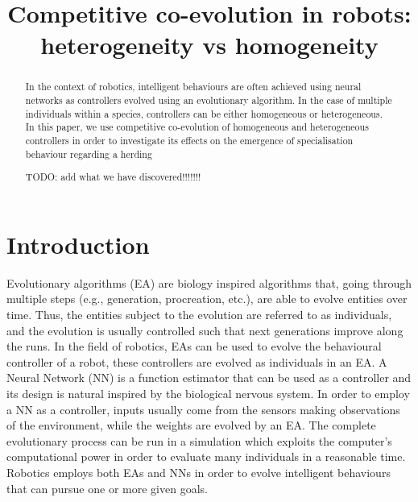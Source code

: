 \documentclass[conference]{IEEEtran}
\begin{document}
 
\title{Competitive co-evolution in robots: \\ heterogeneity vs homogeneity}



\author{
}



\maketitle


\begin{abstract}
In the context of robotics, intelligent behaviours are often achieved using neural networks as controllers evolved using  an evolutionary algorithm.
In the case of multiple individuals within a species, controllers can be either homogeneous or heterogeneous.
In this paper, we use competitive co-evolution of homogeneous and heterogeneous controllers in order to investigate its effects on the emergence of specialisation behaviour regarding a herding 

TODO: add what we have discovered!!!!!!!
\end{abstract}


\IEEEpeerreviewmaketitle


\section{Introduction}
Evolutionary algorithms (EA) are biology inspired algorithms that, going through multiple steps (e.g., generation, procreation, etc.), are able to evolve entities over time.
Thus, the entities subject to the evolution are referred to as individuals,
and the evolution is usually controlled such that next generations improve along the runs.
In the field of robotics, EAs can be used to evolve the behavioural controller of a robot, these controllers are evolved as individuals in an EA.
A Neural Network (NN) is a function estimator that can be used as a controller and its design is natural inspired by the biological nervous system.
In order to employ a NN as a controller, inputs usually come from the sensors making observations of the environment, while the weights are evolved by an EA.
The complete evolutionary process can be run in a simulation which exploits the computer's computational power in order to evaluate many individuals in a reasonable time. 
Robotics employs both EAs and NNs in order to evolve intelligent behaviours that can pursue one or more given goals.
\end{document}
